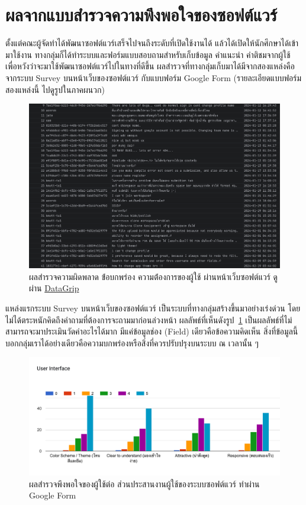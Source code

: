 \documentclass[12pt,one side,openright,a4paper]{cpe-thesis-th}
\newcommand{\thaijustify}[1]{%
  \par\hspace{30pt}\justifying
  #1
}
\begin{document}
\section{ผลจากแบบสำรวจความพึงพอใจของซอฟต์แวร์}
\thaijustify{
  ตั้งแต่คณะผู้จัดทำได้พัฒนาซอฟต์แวร์เสร็จไปจนถึงระดับที่เปิดใช้งานได้ แล้วได้เปิดให้นักศึกษาได้เข้ามาใช้งาน ทางกลุ่มก็ได้ทำระบบและฟอร์มแบบสอบถามสำหรับเก็บข้อมูล คำแนะนำ คำติชมจากผู้ใช้ เพื่อหวังว่าจะมาใช้พัฒนาซอฟต์แวร์ไปในทางที่ดีขึ้น ผลสำรวจที่ทางกลุ่มเก็บมาได้มีจากสองแหล่งคือจากระบบ Survey บนหน้าเว็บของซอฟต์แวร์ กับแบบฟอร์ม Google Form (รายละเอียดแบบฟอร์มสองแหล่งนี้ ไปดูรูปในภาคผนวก)
}
\begin{figure}[H]
  \centering
  \includegraphics[width=12cm]{figure/results/survey/survey-beta-db.png}
  \caption[ผลสำรวจความผิดพลาด ข้่อบกพร่อง ความต้่องการของผู้ใช้]{ผลสำรวจความผิดพลาด ข้่อบกพร่อง ความต้่องการของผู้ใช้ ผ่านหน้าเว็บซอฟต์แวร์ ดูผ่าน \href{https://www.jetbrains.com/datagrip/}{DataGrip}}
  \label{fig:res-survey-beta-db}
\end{figure}
\thaijustify{
  แหล่งแรกระบบ Survey บนหน้าเว็บของซอฟต์แวร์ เป็นระบบที่ทางกลุ่มสร้างขึ้นมาอย่างเร่งด่วน โดยไม่ได้ตระหนักคิดถึงคำถามที่ต้องการจะถามมาก่อนล่วงหน้า ผลลัพธ์ที่เห็นดังรูป~\ref{fig:res-survey-beta-db} เป็นผลลัพธ์ที่ไม่สามารถจะมาประเมินวัดค่าอะไรได้มาก มีแค่ข้อมูลช่อง (Field) เดียวคือข้อความคิดเห็น สิ่งที่ข้อมูลนี้บอกกลุ่มเราได้อย่างเดียวคือความบกพร่องหรือสิ่งที่ควรปรับปรุงบนระบบ ณ เวลานั้น ๆ
}
\begin{figure}[H]
  \centering
  \includegraphics[width=12cm]{figure/results/survey/survey-ui-score.png}
  \caption[ผลสำรวจพึงพอใจของผู้ใช้ต่อส่วนประสานงานผู้ใช้ของระบบซอฟต์แวร์]{ผลสำรวจพึงพอใจของผู้ใช้ต่อ ส่วนประสานงานผู้ใช้ของระบบซอฟต์แวร์ ทำผ่าน Google Form}
  \label{fig:res-survey-ui}
\end{figure}
\end{document}
